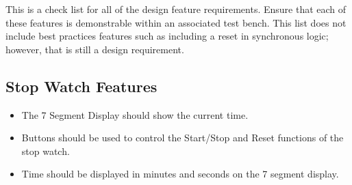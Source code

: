 This is a check list for all of the design feature requirements. Ensure that each of these features is demonstrable within an associated test bench. This list does not include best practices features such as including a reset in synchronous logic; however, that is still a design requirement. \\
\vspace{1cm}
\subsection{Stop Watch Features}
\begin{itemize}
    \item The 7 Segment Display should show the current time.
    \item Buttons should be used to control the Start/Stop and Reset functions of the stop watch. 
    \item Time should be displayed in minutes and seconds on the 7 segment display. 
\end{itemize}

